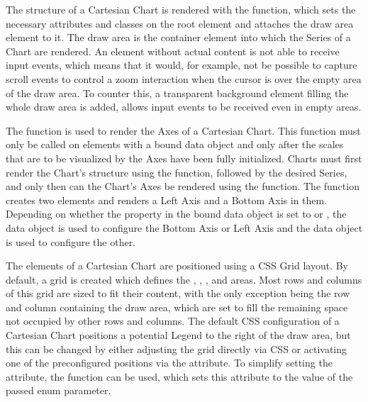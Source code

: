 The structure of a Cartesian Chart is rendered with the
 function, which sets the necessary
attributes and classes on the root element and attaches the draw area
 element to it. The draw area is the container element
into which the Series of a Chart are rendered. An 
element without actual content is not able to receive input events,
which means that it would, for example, not be possible to capture
scroll events to control a zoom interaction when the cursor is over
the empty area of the draw area. To counter this, a transparent
 background element filling the whole draw area is
added, allows input events to be received even in empty areas.

The  function is used to render the
Axes of a Cartesian Chart. This function must only be called on
elements with a bound  data object and only after
the scales that are to be visualized by the Axes have been fully
initialized. Charts must first render the Chart's structure using the
 function, followed by the desired Series,
and only then can the Chart's Axes be rendered using the
 function. The
 function creates two 
elements and renders a Left Axis and a Bottom Axis in them. Depending
on whether the  property in the bound data object is set
to  or , the  data object is used
to configure the Bottom Axis or Left Axis and the  data
object is used to configure the other. 

The elements of a Cartesian Chart are positioned using a CSS Grid
layout. By default, a grid is created which defines the
, , , and
 areas. Most rows and columns of this grid are sized to
fit their content, with the only exception being the row and column
containing the draw area, which are set to fill the remaining space
not occupied by other rows and columns. The default CSS configuration
of a Cartesian Chart positions a potential Legend to the right of the
draw area, but this can be changed by either adjusting the grid
directly via CSS or activating one of the preconfigured positions via
the  attribute. To simplify setting the
 attribute, the
 function can be used, which sets this
attribute to the value of the passed  enum
parameter.







